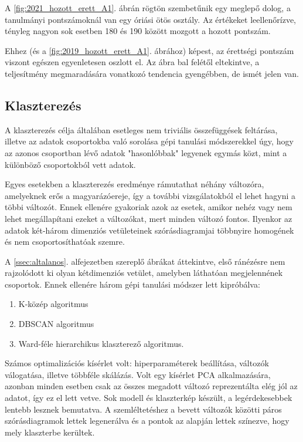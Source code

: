 \documentclass[12pt]{article}
\begin{document}
A \ref{fig:2021_hozott_erett_A1}. ábrán rögtön szembetűnik egy meglepő dolog, a tanulmányi pontszámoknál van egy óriási ötös osztály. Az értékeket leellenőrízve, tényleg nagyon sok esetben 180 és 190 között mozgott a hozott pontszám.

Ehhez (és a \ref{fig:2019_hozott_erett_A1}. ábrához) képest, az érettségi pontszám viszont egészen egyenletesen oszlott el. Az ábra bal felétől eltekintve, a teljesítmény megmaradására vonatkozó tendencia gyengébben, de ismét jelen van.


\subsection{Klaszterezés}

A klaszterezés célja általában esetleges nem triviális összefüggések feltárása, illetve az adatok csoportokba való sorolása gépi tanulási módszerekkel úgy, hogy az azonos csoportban lévő adatok "hasonlóbbak" legyenek egymás közt, mint a különböző csoportokból vett adatok.

Egyes esetekben a klaszterezés eredménye rámutathat néhány változóra, amelyeknek erős a magyarázóereje, így a további vizsgálatokból el lehet hagyni a többi változót. Ennek ellenére gyakoriak azok az esetek, amikor nehéz vagy nem lehet megállapítani ezeket a változókat, mert minden változó fontos. Ilyenkor az adatok két-három dimenziós vetületeinek szórásdiagramjai többnyire homogének és nem csoportosíthatóak szemre.

A \ref{ssec:altalanos}. alfejezetben szereplő ábrákat áttekintve, első ránézésre nem rajzolódott ki olyan kétdimenziós vetület, amelyben láthatóan megjelennének csoportok. Ennek ellenére három gépi tanulási módszer lett kipróbálva:
\begin{enumerate}
\item K-közép algoritmus
\item DBSCAN algoritmus
\item Ward-féle hierarchikus klaszterező algoritmus.
\end{enumerate}

Számos optimalizációs kísérlet volt: hiperparaméterek beállítása, változók válogatása, illetve többféle skálázás. Volt egy kísérlet PCA alkalmazására, azonban minden esetben csak az összes megadott változó reprezentálta elég jól az adatot, így ez el lett vetve. Sok modell és klaszterkép készült, a legérdekesebbek lentebb lesznek bemutatva. A szemléltetéshez a bevett változók közötti páros szórásdiagramok lettek legenerálva és a pontok az alapján lettek színezve, hogy mely klaszterbe kerültek.
\end{document}
